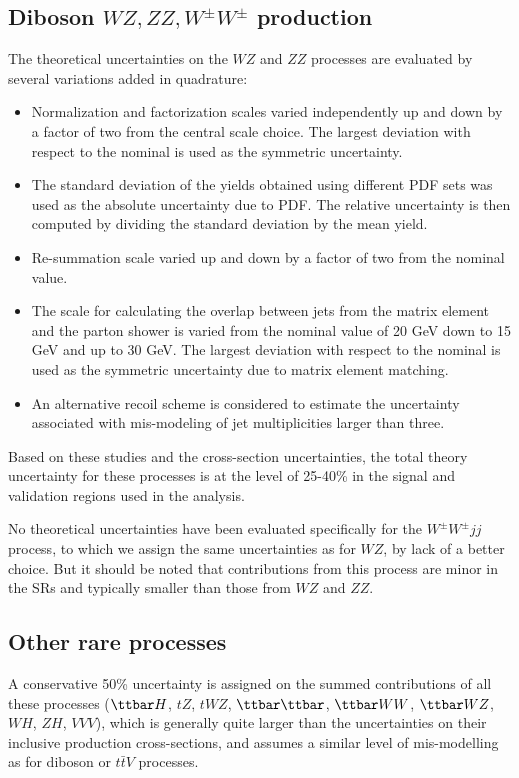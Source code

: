 \subsection*{Diboson $WZ, ZZ, W^\pm W^\pm$ production}

The theoretical uncertainties on the  $WZ$ and $ZZ$ processes are evaluated by several variations added in quadrature:
\begin{itemize}
\item Normalization and factorization scales varied independently up and down by a factor of two from the central scale choice. The largest deviation with respect to the nominal is used as the 
symmetric uncertainty.
\item The standard deviation of the yields obtained using different PDF sets was used as the absolute uncertainty due to PDF. 
The relative uncertainty is then computed by dividing the standard deviation by the mean yield.
\item Re-summation scale varied up and down by a factor of two from the nominal value.
\item The scale for calculating the overlap between jets from the matrix element and the parton shower is varied from the nominal value of 20 GeV down to 15 GeV 
 and up to 30 GeV. The largest deviation with respect to the nominal is used as the symmetric uncertainty due to matrix element matching.
\item An alternative recoil scheme is considered to estimate the uncertainty associated with mis-modeling of jet multiplicities larger than three.
\end{itemize}

Based on these studies and the cross-section uncertainties, the total theory uncertainty for these processes is at the level of 25-40\% in the signal and validation regions used in the analysis. 

No theoretical uncertainties have been evaluated specifically for the $W^\pm W^\pm jj$ process, 
to which we assign the same uncertainties as for $WZ$, by lack of a better choice. 
But it should be noted that contributions from this process are minor in the SRs and typically  
smaller than those from $WZ$ and $ZZ$.

\subsection*{Other rare processes}
A conservative 50\% uncertainty is assigned on the summed contributions 
of all these processes ($\ttbar H$, $tZ$, $tWZ$, $\ttbar\ttbar$, $\ttbar WW$, $\ttbar WZ$, $WH$, $ZH$, $VVV$), 
which is generally quite larger than the uncertainties on their inclusive production cross-sections, 
and assumes a similar level of mis-modelling as for diboson or $t\bar t V$ processes. 
